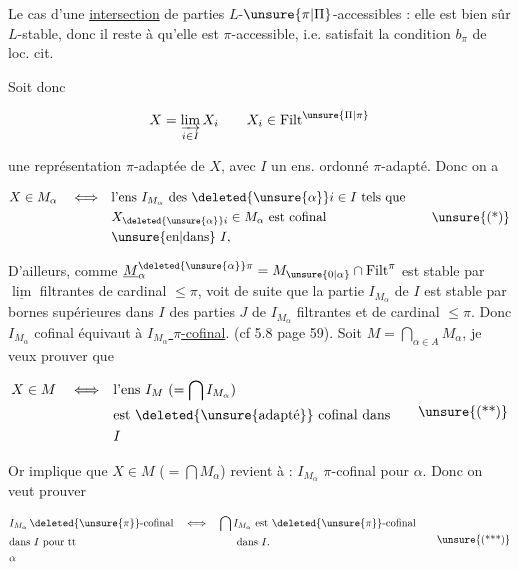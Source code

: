 Le cas d'une \uline{intersection}  de parties $L$-$\unsure{\pi|\Pi}$-accessibles : elle est bien sûr $L$-stable, donc il reste à  qu'elle est $\pi$-accessible, i.e. satisfait la condition $b_\pi$ de loc. cit.


Soit donc 

\[
 X=\varinjlim_{i\in I} X_i \qquad X_i\in\mathrm{Filt}^{\unsure{\Pi|\pi}}
\]

une représentation $\pi$-adaptée de $X$, avec $I$ un ens. ordonné $\pi$-adapté. Donc on a

\[
\begin{aligned}
 X\in M_\alpha \quad\Longleftrightarrow\quad
 &\text{l'ens $I_{M_\alpha}$ des $\deleted{\unsure{\alpha}}i\in I$ tels que}\\
 &X_{\deleted{\unsure{\alpha}}i}\in M_\alpha\ \text{est cofinal}\\
 &\text{\unsure{en|dans} $I$,}
\end{aligned}\tag*{\unsure{(*)}}
\]

D'ailleurs, comme $\underline M^{\deleted{\unsure{\alpha}}\pi}_{\alpha}=M_{\unsure{0|\alpha}}\cap\mathrm{Filt}^\pi$ est stable par $\underline{\lim}$ filtrantes de cardinal $\leq\pi$,  voit  de suite que la partie $I_{M_\alpha}$ de $I$ est stable par bornes supérieures dans $I$ des parties $J$ de $I_{M_\alpha}$ filtrantes et de cardinal $\leq\pi$. Donc $I_{M_\alpha}$ cofinal équivaut à \uline{$I_{M_\alpha}$ $\pi$-cofinal}. (cf 5.8 page 59). Soit $M=\bigcap_{\alpha\in A}M_\alpha$, je veux prouver que

\[
\begin{aligned}
 X\in M \quad\Longleftrightarrow\quad &\text{l'ens $I_M$ ($=\bigcap I_{M_\alpha}$)}\\
 &\text{est \deleted{\unsure{adapté}} cofinal dans}\\
 &I
\end{aligned}\tag*{\unsure{(**)}}
\]

Or \unsure{(*)} implique que $X\in M$ ($=\bigcap M_\alpha$) revient à : $I_{M_\alpha}$ $\pi$-cofinal pour  $\alpha$. Donc  on veut prouver

\[
\begin{aligned}
 &I_{M_\alpha}\,\deleted{\unsure{\pi}}\text{-cofinal}
 &&\Longleftrightarrow\quad \bigcap I_{M_\alpha}\ \text{est $\deleted{\unsure{\pi}}$-cofinal}\\
 &\text{dans $I$ pour tt} &&\hspace{5em}\text{dans }I.\\
 &\alpha
\end{aligned}\tag*{\unsure{(***)}}
\]

